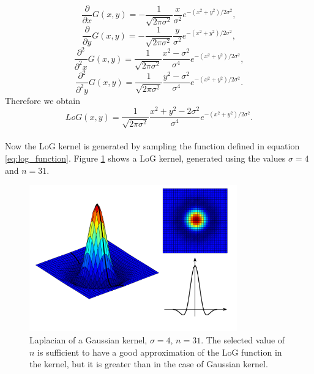 \documentclass{ipol}
\numberwithin{equation}{section}
\numberwithin{table}{section}
\begin{document}
\begin{equation} 
	\frac{\partial}{\partial x}G(x,y)=-\frac{1}{\sqrt{2\pi\sigma^2}}\frac{x}{\sigma^2}e^{-(x^2+y^2)/2\sigma^2},
\end{equation}
\begin{equation} 
	\frac{\partial}{\partial y}G(x,y)=-\frac{1}{\sqrt{2\pi\sigma^2}}\frac{y}{\sigma^2}e^{-(x^2+y^2)/2\sigma^2},
\end{equation}
\begin{equation} 
	\frac{\partial^2}{\partial^2 x}G(x,y)=\frac{1}{\sqrt{2\pi\sigma^2}}\frac{x^2-\sigma^2}{\sigma^4}e^{-(x^2+y^2)/2\sigma^2},
\end{equation}
\begin{equation} 
	\frac{\partial^2}{\partial^2 y}G(x,y)=\frac{1}{\sqrt{2\pi\sigma^2}}\frac{y^2-\sigma^2}{\sigma^4}e^{-(x^2+y^2)/2\sigma^2}.
\end{equation}
Therefore we obtain
\begin{equation}
	\label{eq:log_function}
	LoG(x,y)=\frac{1}{\sqrt{2\pi\sigma^2}}\frac{x^2+y^2-2\sigma^2}{\sigma^4}e^{-(x^2+y^2)/2\sigma^2}.
\end{equation}\\

Now the LoG kernel is generated by sampling the function defined in equation \ref{eq:log_function}. 
Figure \ref{fig:log_kernel} shows a LoG kernel, generated using the values $\sigma=4$ and $n=31$.

\begin{figure}[ht]
	\centering
	\includegraphics[width=0.8\textwidth]{kernel_log.pdf}
	\caption{Laplacian of a Gaussian kernel, $\sigma=4$, $n=31$. The selected value of $n$ is sufficient 
to have a good approximation of the LoG function in the kernel, but it is greater than in the case of 
Gaussian kernel.}
	\label{fig:log_kernel}
\end{figure}
\end{document}
